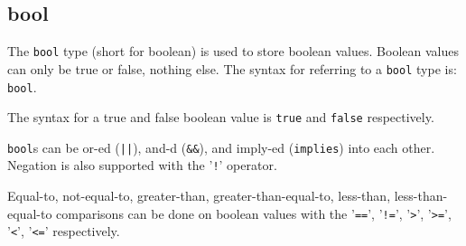 
\subsection{bool}
{
	The \texttt{bool} type (short for boolean) is used to store boolean values.
	Boolean values can only be true or false, nothing else.
	The syntax for referring to a \texttt{bool} type is: \texttt{bool}.
	
	The syntax for a true and false boolean value is \texttt{true} and
	\texttt{false} respectively.
	
	\texttt{bool}s can be or-ed (\texttt{||}),
	and-d (\texttt{\&\&}), and imply-ed (\texttt{implies})
	into each
	other. Negation is also supported
	with the '\texttt{!}' operator.
	
	Equal-to, not-equal-to, greater-than, greater-than-equal-to,
	less-than, less-than-equal-to comparisons can be done on boolean values with
	the '\texttt{==}', '\texttt{!=}',
	'\texttt{>}', '\texttt{>=}', '\texttt{<}', '\texttt{<=}' respectively.
}
